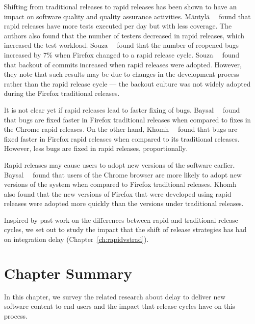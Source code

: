 Shifting from traditional releases to rapid releases has been shown to have an impact on software
quality and quality assurance activities. M\"antyl\"a~\etal~\cite{mantyla2014rapid} found that rapid
releases have more tests executed per day but with less coverage. The authors also found that the
number of testers decreased in rapid releases, which increased the test workload.
Souza~\etal~\cite{souza2014rapid} found that the number of reopened bugs increased by 7\% when
Firefox changed to a rapid release cycle. Souza~\etal~\cite{souzabackout} found that backout of
commits increased when rapid releases were adopted.  However, they note that such results may be due
to changes in the development process rather than the rapid release cycle --- the backout culture
was not widely adopted during the Firefox traditional releases.

It is not clear yet if rapid releases lead to faster fixing of bugs.
Baysal~\etal~\cite{baysal2011tale} found that bugs are fixed faster in Firefox traditional releases
when compared to fixes in the Chrome rapid releases. On the other hand,
Khomh~\etal~\cite{khomh2012faster} found that bugs are fixed faster in Firefox rapid releases when
compared to its traditional releases.  However, less bugs are fixed in rapid releases,
proportionally.

Rapid releases may cause users to adopt new versions of the software earlier.
Baysal~\etal~\cite{baysal2011tale} found that users of the Chrome browser are more likely to adopt
new versions of the system when compared to Firefox traditional releases.
Khomh~\etal~\cite{khomh2012faster} also found that the new versions of Firefox that were developed
using rapid releases were adopted more quickly than the versions under traditional releases.

Inspired by past work on the differences between rapid and traditional release cycles, we set out to
study the impact that the shift of release strategies has had on integration delay
(Chapter~\ref{ch:rapidvstrad}).

\section{Chapter Summary}

In this chapter, we survey the related research about delay to deliver new software content to end
users and the impact that release cycles have on this process. 
